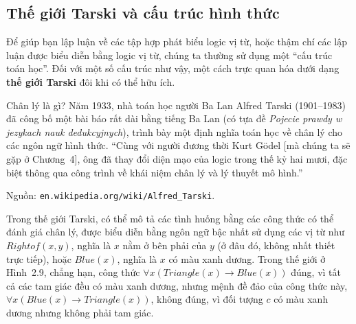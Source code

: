 \subsection{Thế giới Tarski và cấu trúc hình thức}

Để giúp bạn lập luận về các tập hợp phát biểu logic vị từ, hoặc thậm chí các lập luận được biểu diễn bằng logic vị từ, chúng ta thường sử dụng một ``cấu trúc toán học''. Đối với một số cấu trúc như vậy, một cách trực quan hóa dưới dạng \textbf{thế giới Tarski} đôi khi có thể hữu ích.

\begin{infobox}
Chân lý là gì? Năm 1933, nhà toán học người Ba Lan Alfred Tarski (1901--1983) đã công bố một bài báo rất dài bằng tiếng Ba Lan (có tựa đề \textit{Pojecie prawdy w jezykach nauk dedukcyjnych}), trình bày một định nghĩa toán học về chân lý cho các ngôn ngữ hình thức. ``Cùng với người đương thời Kurt Gödel [mà chúng ta sẽ gặp ở Chương~4], ông đã thay đổi diện mạo của logic trong thế kỷ hai mươi, đặc biệt thông qua công trình về khái niệm chân lý và lý thuyết mô hình.''

Nguồn: \texttt{en.wikipedia.org/wiki/Alfred\_Tarski}.
\end{infobox}

Trong thế giới Tarski, có thể mô tả các tình huống bằng các công thức có thể đánh giá chân lý, được biểu diễn bằng ngôn ngữ bậc nhất sử dụng các vị từ như $Rightof(x,y)$, nghĩa là $x$ nằm ở bên phải của $y$ (ở đâu đó, không nhất thiết trực tiếp), hoặc $Blue(x)$, nghĩa là $x$ có màu xanh dương. Trong thế giới ở Hình~2.9, chẳng hạn, công thức $\forall x(Triangle(x) \to Blue(x))$ đúng, vì tất cả các tam giác đều có màu xanh dương, nhưng mệnh đề đảo của công thức này, $\forall x(Blue(x) \to Triangle(x))$, không đúng, vì đối tượng $c$ có màu xanh dương nhưng không phải tam giác.

